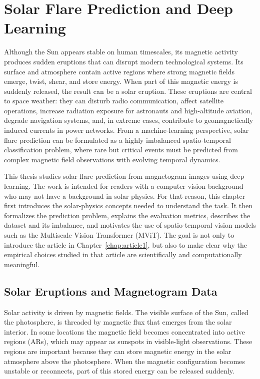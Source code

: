 \anglais

\chapter{Solar Flare Prediction and Deep Learning}
\label{chap:introduction}

Although the Sun appears stable on human timescales, its magnetic activity produces sudden eruptions that can disrupt modern technological systems. Its surface and atmosphere contain active regions where strong magnetic fields emerge, twist, shear, and store energy. When part of this magnetic energy is suddenly released, the result can be a solar eruption. These eruptions are central to space weather: they can disturb radio communication, affect satellite operations, increase radiation exposure for astronauts and high-altitude aviation, degrade navigation systems, and, in extreme cases, contribute to geomagnetically induced currents in power networks. From a machine-learning perspective, solar flare prediction can be formulated as a highly imbalanced spatio-temporal classification problem, where rare but critical events must be predicted from complex magnetic field observations with evolving temporal dynamics.

This thesis studies solar flare prediction from magnetogram images using deep learning. The work is intended for readers with a computer-vision background who may not have a background in solar physics. For that reason, this chapter first introduces the solar-physics concepts needed to understand the task. It then formalizes the prediction problem, explains the evaluation metrics, describes the dataset and its imbalance, and motivates the use of spatio-temporal vision models such as the Multiscale Vision Transformer (MViT). The goal is not only to introduce the article in Chapter~\ref{chap:article1}, but also to make clear why the empirical choices studied in that article are scientifically and computationally meaningful.

\section{Solar Eruptions and Magnetogram Data}

Solar activity is driven by magnetic fields. The visible surface of the Sun, called the photosphere, is threaded by magnetic flux that emerges from the solar interior. In some locations the magnetic field becomes concentrated into active regions (ARs), which may appear as sunspots in visible-light observations. These regions are important because they can store magnetic energy in the solar atmosphere above the photosphere. When the magnetic configuration becomes unstable or reconnects, part of this stored energy can be released suddenly.

